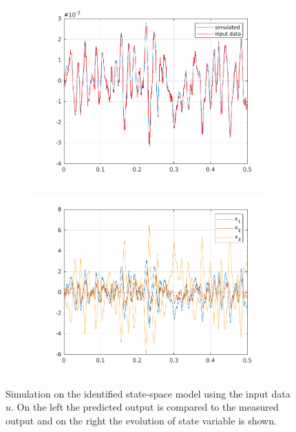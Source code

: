\begin{figure}[h]
	\begin{subfigure}{0.49\textwidth}
		\includegraphics[width=\textwidth]{figures/ss_id_output.pdf}	
	\end{subfigure}
	\begin{subfigure}{0.49\textwidth}
		\includegraphics[width=\textwidth]{figures/ss_id_states.pdf}	
	\end{subfigure}
	\caption{Simulation on the identified state-space model using the input data $u$. On the left the predicted output is compared to the measured output and on the right the evolution of state variable is shown.}
	\label{fig:ss_id_results}
\end{figure}
